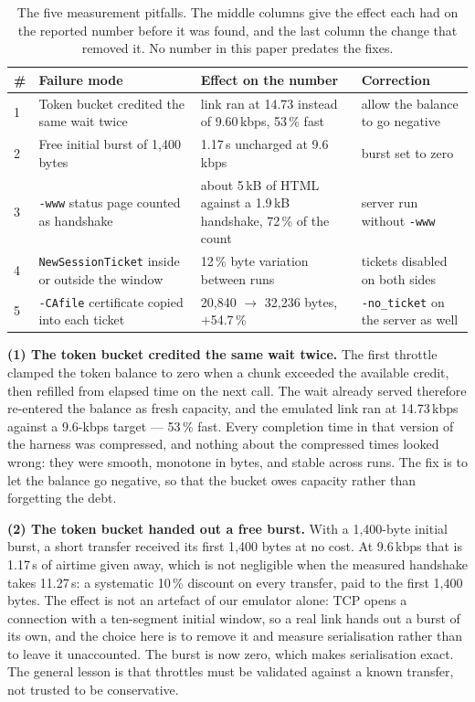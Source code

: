 \documentclass[]{spie}  %
\begin{document}
\begin{table}[h]
\caption{The five measurement pitfalls. The middle columns give the
effect each had on the reported number before it was found, and the last
column the change that removed it. No number in this paper predates the
fixes.}
\label{tab:pitfalls}
\begin{center}
\begin{tabular}{@{}p{}p{}p{}p{}@{}}
\toprule
\# & Failure mode & Effect on the number & Correction \\
\midrule
1 & Token bucket credited the same wait twice & link ran at 14.73
instead of 9.60\,kbps, 53\,\% fast & allow the balance to go negative \\
2 & Free initial burst of 1{,}400 bytes & 1.17\,s uncharged at
9.6\,kbps & burst set to zero \\
3 & \texttt{-www} status page counted as handshake & about 5\,kB of HTML
against a 1.9\,kB handshake, 72\,\% of the count & server run without
\texttt{-www} \\
4 & \texttt{NewSessionTicket} inside or outside the window & 12\,\% byte
variation between runs & tickets disabled on both sides \\
5 & \texttt{-CAfile} certificate copied into each ticket & 20{,}840
$\to$ 32{,}236 bytes, $+$54.7\,\% & \texttt{-no\_ticket} on the server
as well \\
\bottomrule
\end{tabular}
\end{center}
\end{table}

\textbf{(1) The token bucket credited the same wait twice.} The first
throttle clamped the token balance to zero when a chunk exceeded the
available credit, then refilled from elapsed time on the next call. The
wait already served therefore re-entered the balance as fresh capacity,
and the emulated link ran at 14.73\,kbps against a 9.6-kbps target ---
53\,\% fast. Every completion time in that version of the harness was
compressed, and nothing about the compressed times looked wrong: they
were smooth, monotone in bytes, and stable across runs. The fix is to
let the balance go negative, so that the bucket owes capacity rather
than forgetting the debt.

\textbf{(2) The token bucket handed out a free burst.} With a 1{,}400-byte
initial burst, a short transfer received its first 1{,}400 bytes at no
cost. At 9.6\,kbps that is 1.17\,s of airtime given away, which is not
negligible when the measured handshake takes 11.27\,s: a systematic
10\,\% discount on every transfer, paid to the first 1{,}400 bytes. The
effect is not an artefact of our emulator alone: TCP opens a connection
with a ten-segment initial window\cite{rfc6928}, so a real link hands out
a burst of its own, and the choice here is to remove it and measure
serialisation rather than to leave it unaccounted. The burst is now
zero, which makes serialisation exact. The general lesson is that
throttles must be validated against a known transfer, not trusted to be
conservative.
\end{document}
